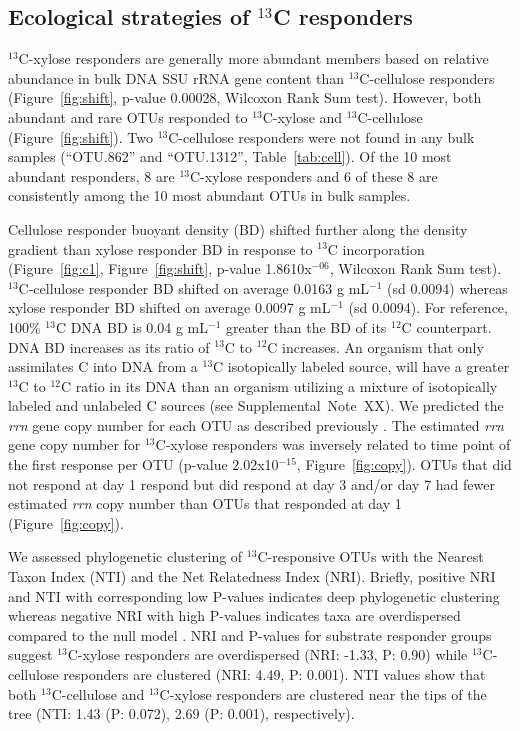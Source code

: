 \subsection{Ecological strategies of $^{13}$C responders}
$^{13}$C-xylose responders are generally more abundant members based on
relative abundance in bulk DNA SSU rRNA gene content than $^{13}$C-cellulose
responders (Figure~\ref{fig:shift}, p-value 0.00028, Wilcoxon Rank Sum test).
However, both abundant and rare OTUs responded to $^{13}$C-xylose and
$^{13}$C-cellulose (Figure~\ref{fig:shift}). Two $^{13}$C-cellulose responders
were not found in any bulk samples (``OTU.862'' and ``OTU.1312'',
Table~\ref{tab:cell}). Of the 10 most abundant responders, 8 are
$^{13}$C-xylose responders and 6 of these 8 are consistently among the 10 most
abundant OTUs in bulk samples.

Cellulose responder buoyant density (BD) shifted further along the density
gradient than xylose responder BD in response to $^{13}$C incorporation
(Figure~\ref{fig:c1}, Figure~\ref{fig:shift}, p-value 1.8610x$^{-06}$, Wilcoxon
Rank Sum test). $^{13}$C-cellulose responder BD shifted on average
0.0163 g mL$^{-1}$ (sd 0.0094) whereas xylose responder BD shifted on average
0.0097 g mL$^{-1}$ (sd 0.0094). For reference, 100\% $^{13}$C DNA BD is 0.04
g mL$^{-1}$ greater than the BD of its $^{12}$C counterpart. DNA BD increases
as its ratio of $^{13}$C to $^{12}$C increases. An organism that only
assimilates C into DNA from a $^{13}$C isotopically labeled source, will have
a greater $^{13}$C to $^{12}$C ratio in its DNA than an organism utilizing
a mixture of isotopically labeled and unlabeled C sources (see
Supplemental~Note~XX). We predicted the \textit{rrn} gene copy number for each
OTU as described previously \citep{Kembel_2012}. The estimated
\textit{rrn} gene copy number for $^{13}$C-xylose responders was inversely
related to time point of the first response per OTU (p-value
2.02x10$^{-15}$, Figure~\ref{fig:copy}). OTUs that did not respond at day
1 respond but did respond at day 3 and/or day 7 had fewer estimated
\textit{rrn} copy number than OTUs that responded at day 1
(Figure~\ref{fig:copy}). 

We assessed phylogenetic clustering of $^{13}$C-responsive OTUs with the
Nearest Taxon Index (NTI) and the Net Relatedness Index (NRI). Briefly,
positive NRI and NTI with corresponding low P-values indicates deep
phylogenetic clustering whereas negative NRI with high P-values indicates taxa
are overdispersed compared to the null model \citep{Evans2014a}. NRI and
P-values for substrate responder groups suggest $^{13}$C-xylose responders are
overdispersed (NRI: -1.33, P: 0.90) while $^{13}$C-cellulose responders are
clustered (NRI: 4.49, P: 0.001). NTI values show that both $^{13}$C-cellulose
and $^{13}$C-xylose responders are clustered near the tips of the tree (NTI:
1.43 (P: 0.072), 2.69 (P: 0.001), respectively). 






